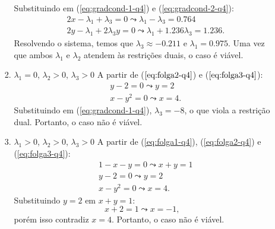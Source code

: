 \documentclass[11pt,a4paper]{article}
\begin{document}
\begin{enumerate}
\begin{itemize}
\begin{enumerate}[label=\roman*]
                Substituindo em (\ref{eq:gradcond-1-q4}) e (\ref{eq:gradcond-2-q4}):
                \begin{equation*}
                    \begin{aligned}
                        & 2x - \lambda_1 + \lambda_3 = 0 \leadsto \lambda_1 - \lambda_3 = 0.764\\
                        & 2y - \lambda_1 + 2\lambda_3y = 0 \leadsto \lambda_1 + 1.236\lambda_3 = 1.236.
                    \end{aligned}
                \end{equation*}
                Resolvendo o sistema, temos que $\lambda_3 \approx -0.211$ e $\lambda_1 = 0.975$. Uma vez que ambos $\lambda_1$ e $\lambda_2$ atendem às restrições duais, o caso é viável.
                \item $\lambda_1 = 0$, $\lambda_2 > 0$, $\lambda_3 > 0$
                A partir de ($\ref{eq:folga2-q4}$) e ($\ref{eq:folga3-q4}$):
                \begin{equation*}
                    \begin{aligned}
                        & y - 2 = 0 \leadsto y = 2\\
                        & x - y^2 = 0 \leadsto x = 4.
                    \end{aligned}
                \end{equation*}
                Substituindo em (\ref{eq:gradcond-1-q4}), $\lambda_3 = -8$, o que viola a restrição dual. Portanto, o caso não é viável. 
                \item $\lambda_1 > 0$, $\lambda_2 > 0$, $\lambda_3 > 0$
                A partir de (\ref{eq:folga1-q4}), (\ref{eq:folga2-q4}) e (\ref{eq:folga3-q4}):
                \begin{equation*}
                    \begin{aligned}
                        & 1 - x - y = 0 \leadsto x + y = 1\\
                        & y - 2 = 0 \leadsto y = 2\\
                        & x - y^2 = 0 \leadsto x = 4.
                    \end{aligned}
                \end{equation*}
                Substituindo $y = 2$ em $x + y = 1$:
                \begin{equation*}
                    x + 2 = 1 \leadsto x = -1,
                \end{equation*}
                \noindent porém isso contradiz $x = 4$. Portanto, o caso não é viável.

\end{enumerate}
\end{itemize}
\end{enumerate}
\end{document}
